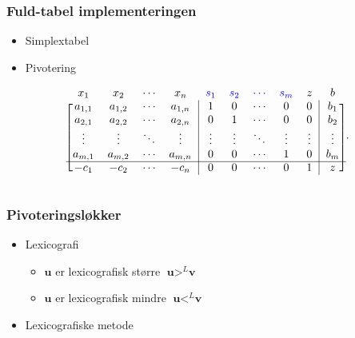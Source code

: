 \begin{frame}
\frametitle{Fuld-tabel implementeringen}
\begin{itemize}
\item Simplextabel 
\item Pivotering
\end{itemize}
\begin{align*}
\begin{blockarray}{ccccccccccc}
x_1 & x_2 & \cdots & x_n & \textcolor{blue}{s_1} & \textcolor{blue}{s_2} &  \textcolor{blue}{\cdots} & \textcolor{blue}{s_m} & z & b \\
\begin{block}{[cccc|ccccc|c]c}
a_{1,1} & a_{1,2} & \cdots & a_{1,n} & 1 & 0 & \cdots & 0 & 0 & b_1 \\
a_{2,1} & a_{2,2} & \cdots & a_{2,n} & 0 & 1 & \cdots & 0 & 0 & b_2 \\
\vdots & \vdots & \ddots & \vdots & \vdots & \vdots & \ddots & \vdots & \vdots & \vdots \\
a_{m,1} & a_{m,2} & \cdots & a_{m,n} & 0 & 0 & \cdots  & 1  & 0 & b_{m}\\
\cline{1-10}
-c_1 & -c_2 & \cdots & -c_n & 0 & 0 & \cdots & 0 & 1 & z\\
\end{block}
\end{blockarray}.
\end{align*}
\end{frame}

\begin{frame}
\frametitle{Pivoteringsløkker}
\begin{itemize}
\item Lexicografi
	\begin{itemize}
	\item $\mathbf{u}$ er lexicografisk større $\textbf{u} >^L \textbf{v}$
	\item $\mathbf{u}$ er lexicografisk mindre $ \textbf{u} <^L \textbf{v}$
	\end{itemize}
\item Lexicografiske metode 
\end{itemize}
\end{frame}


